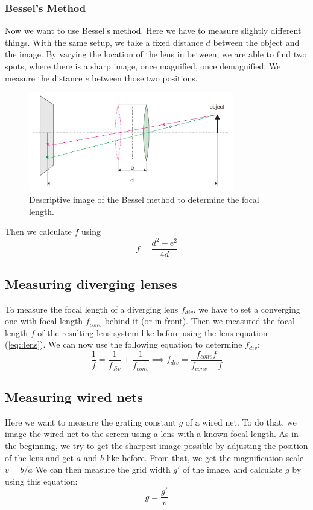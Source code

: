 \subsubsection{Bessel's Method}
\label{chap::bessel}
Now we want to use Bessel's method.
Here we have to measure slightly different things.
With the same setup, we take a fixed distance $d$ between the object and the image. 
By varying the location of the lens in between, we are able to find two spots, where there is a sharp image, once magnified, once demagnified.
We measure the distance $e$ between those two positions.
\begin{figure}[h!]
	\centering
	\includegraphics[width=0.8\textwidth]{img/bessel.PNG}
	\caption{Descriptive image\cite{manual} of the Bessel method to determine the focal length.}
	\label{fig::bessel}
\end{figure}
 Then we calculate $f$ using
\begin{equation}
	f = \frac{d^2 - e^2}{4d}
\end{equation}


\subsection{Measuring diverging lenses}
\label{chap::div}
To measure the focal length of a diverging lens $f_{div}$, we have to set a converging one with focal length $f_{conv}$ behind it (or in front). 
Then we measured the focal length $f$ of the resulting lens system like before using the lens equation (\ref{eq::lens}).
We can now use the following equation to determine $f_{div}$:
\begin{equation}
	\frac{1}{f} = \frac{1}{f_{div}} + \frac{1}{f_{conv}} \implies f_{div} = \frac{f_{conv} f}{f_{conv} - f}
	\label{eq::div}
\end{equation}


\subsection{Measuring wired nets}
\label{chap::net}
Here we want to measure the grating constant $g$ of a wired net.
To do that, we image the wired net to the screen using a lens with a known focal length.
As in the beginning, we try to get the sharpest image possible by adjusting the position of the lens and get $a$ and $b$ like before.
From that, we get the magnification scale $v = b/a$
We can then measure the grid width $g'$ of the image, and calculate $g$ by using this equation:
\begin{equation}
	g = \frac{g'}{v}
	\label{eq::grid}
\end{equation}

